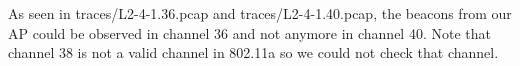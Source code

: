 As seen in traces/L2-4-1.36.pcap and traces/L2-4-1.40.pcap, the beacons from our AP could be observed in channel 36 and not anymore in channel 40. Note that channel 38 is not a valid channel in 802.11a so we could not check that channel.

